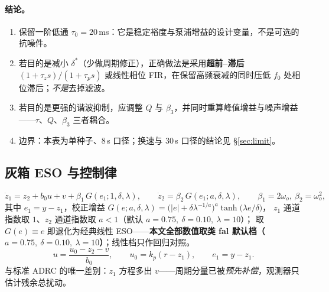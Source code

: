 \documentclass[11pt,a4paper]{article}
\theoremstyle{remark}\newtheorem{remark}{注}
\begin{document}
\paragraph{结论。}
\begin{enumerate}
  \item 保留一阶低通 $\tau_0=20$\,ms：它是稳定裕度与泵浦增益的设计变量，不是可选的抗噪件。
  \item 若目的是减小 $\delta^{*}$（少做周期修正），正确做法是采用\textbf{超前--滞后} $(1+\tau_z s)/(1+\tau_p s)$
        或线性相位 FIR，在保留高频衰减的同时压低 $f_0$ 处相位滞后；\emph{不是}去掉滤波。
  \item 若目的是更强的谐波抑制，应调整 $Q$ 与 $\beta_3$，并同时重算峰值增益与噪声增益——$\tau$、$Q$、$\beta_3$ 三者耦合。
  \item 边界：本表为单种子、$8$\,s 口径；换速与 $30$\,s 口径的结论见 §\ref{sec:limit}。
\end{enumerate}

\subsection{灰箱 ESO 与控制律}
\begin{equation}
  \dot z_1 = z_2+b_0u+v+\beta_1\,G(e_1;1,\delta,\lambda),\qquad
  \dot z_2 = \beta_2\,G(e_1;a,\delta,\lambda),\qquad
  \beta_1=2\omega_o,\ \beta_2=\omega_o^2,
\end{equation}
其中 $e_1=y-z_1$，校正增益
$G(e;a,\delta,\lambda)=\bigl(|e|+\delta\lambda^{-1/a}\bigr)^{a}\tanh\!\big(\lambda e/\delta\big)$，
$z_1$ 通道指数取 $1$、$z_2$ 通道指数取 $a<1$（默认 $a=0.75,\ \delta=0.10,\ \lambda=10$）；
取 $G(e)\equiv e$ 即退化为经典线性 ESO——\textbf{本文全部数值取类 fal 默认档（$a=0.75,\ \delta=0.10,\ \lambda=10$）}；线性档只作回归对照。
\begin{equation}
  u = \frac{u_0-z_2-v}{b_0},\qquad u_0 = k_p(r-z_1),\qquad e_1 = y-z_1 .
\end{equation}
与标准 ADRC 的唯一差别：$z_1$ 方程多出 $v$——周期分量已被\emph{预先补偿}，观测器只估计残余总扰动。
\end{document}
